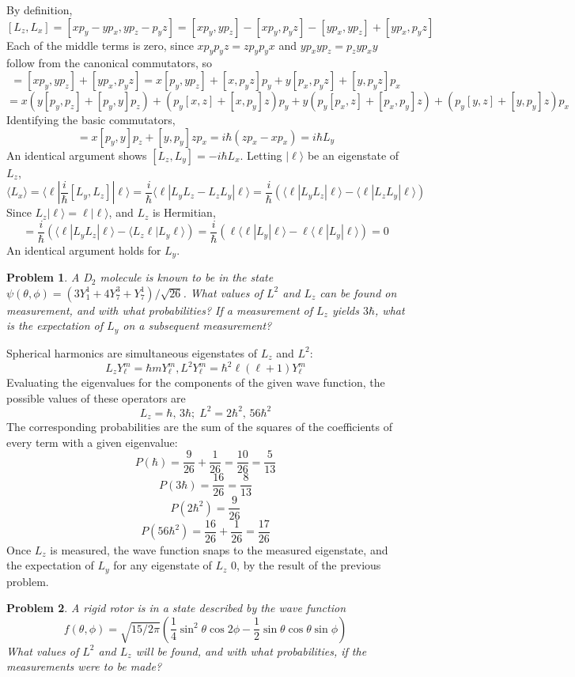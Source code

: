 \documentclass{article}
\newtheorem{prob}{Problem}
\begin{document}
By definition,
\[
  [L_{z}, L_{x}] = [xp_{y}-yp_{x}, yp_{z}-p_{y}z] = [xp_{y}, yp_{z}]-[xp_{y}, p_{y}z]-[yp_{x}, yp_{z}] + [yp_{x}, p_{y}z]
\]
Each of the middle terms is zero, since $xp_{y}p_{y}z = zp_{y}p_{y}x$ and $yp_{x}yp_{z} = p_{z}yp_{x}y$ follow from the canonical commutators, so
\[
  = [xp_{y}, yp_{z}] + [yp_{x}, p_{y}z]
  = x[p_{y}, yp_{z}] + [x, p_{y}z]p_{y} + y[p_{x}, p_{y}z] + [y, p_{y}z]p_{x}
\]
\[
  = x\left( y[p_{y}, p_{z}] + [p_{y}, y]p_{z} \right) + \left( p_{y}[x, z] + [x, p_{y}]z \right)p_{y}
  + y\left( p_{y}[p_{x}, z] + [p_{x}, p_{y}]z \right) + \left( p_{y}[y, z] + [y, p_{y}]z \right)p_{x}
\]
Identifying the basic commutators,
\[
  = x[p_{y}, y]p_{z} + [y, p_{y}]zp_{x}
  = i\hbar(zp_{x}- xp_{x})
  = i\hbar L_{y}
\]
An identical argument shows $[L_{z}, L_{y}] = -i\hbar L_{x}$.
Letting $|\ell\rangle$ be an eigenstate of $L_{z}$,
\[
  \langle L_{x} \rangle = \langle \ell | \frac{i}{\hbar}[L_{y}, L_{z}] | \ell \rangle = \frac{i}{\hbar}\langle \ell | L_{y}L_{z}-L_{z}L_{y}| \ell  \rangle
  = \frac{i}{\hbar}\left( \langle \ell | L_{y}L_{z} |\ell\rangle -\langle \ell | L_{z}L_{y}|\ell \rangle\right)
\]
Since $L_{z}|\ell\rangle = \ell|\ell\rangle$, and $L_{z}$ is Hermitian,
\[
  = \frac{i}{\hbar}\left( \langle \ell|L_{y}L_{z}|\ell \rangle -\langle L_{z}\ell | L_{y}\ell \rangle\right)
  = \frac{i}{\hbar}\left( \ell\langle  \ell | L_{y}|\ell\rangle -\ell\langle\ell| L_{y}|\ell \rangle\right)
  = 0
\]
An identical argument holds for $L_{y}$.

\begin{prob}
  A D$_{2}$ molecule is known to be in the state $\psi(\theta,\phi)=(3Y_{1}^{1}+4Y_{7}^{3}+Y_{7}^{1})/\sqrt{26}$.
  What values of $L^{2}$ and $L_{z}$ can be found on measurement, and with what probabilities?
  If a measurement of $L_{z}$ yields $3\hbar$, what is the expectation of $L_{y}$ on a subsequent measurement?
\end{prob}

Spherical harmonics are simultaneous eigenstates of $L_{z}$ and $L^{2}$:
\[L_{z}Y_{\ell}^{m}=\hbar m Y_{\ell}^{m}, L^{2}Y_{\ell}^{m}=\hbar^{2}\ell(\ell+1)Y_{\ell}^{m}\]
Evaluating the eigenvalues for the components of the given wave function, the possible values of these operators are
\[
  L_{z} = \hbar,\, 3\hbar;\; L^{2}= 2\hbar^{2},\, 56\hbar^{2}
\]
The corresponding probabilities are the sum of the squares of the coefficients of every term with a given eigenvalue:
\[
  P(\hbar) = \frac{9}{26} + \frac{1}{26} = \frac{10}{26} = \frac{5}{13}
\]
\[
  P(3\hbar) = \frac{16}{26} = \frac{8}{13}
\]
\[
  P(2\hbar^{2}) = \frac{9}{26}
\]
\[
  P(56\hbar^{2}) = \frac{16}{26} + \frac{1}{26} = \frac{17}{26}
\]
Once $L_{z}$ is measured, the wave function snaps to the measured eigenstate, and the expectation of $L_{y}$ for any eigenstate of $L_{z}$ 0,
by the result of the previous problem.
\begin{prob}
  A rigid rotor is in a state described by the wave function
  \[
    f(\theta, \phi) = \sqrt{15 / 2\pi} \left(\frac{1}{4}\sin^{2}\theta\cos2\phi-\frac{1}{2}\sin\theta\cos\theta\sin\phi\right)
  \]
  What values of $L^{2}$ and $L_{z}$ will be found, and with what probabilities, if the measurements were to be made?
\end{prob}
\end{document}
